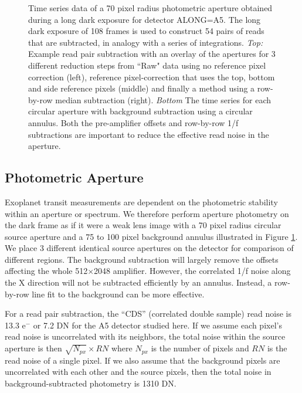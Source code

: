 \documentclass[]{aastex62}
\begin{document}
\begin{figure}[!hbtp]
\caption{Time series data of a 70 pixel radius photometric aperture obtained during a long dark exposure for detector ALONG=A5. The long dark exposure of 108 frames is used to construct 54 pairs of reads that are subtracted, in analogy with a series of integrations.
{\it Top:}  Example read pair subtraction with an overlay of the apertures for 3 different reduction steps from ``Raw" data using no reference pixel correction (left), reference pixel-correction that uses the top, bottom and side reference pixels (middle) and finally a method using a row-by-row median subtraction (right).
{\it Bottom} The time series for each circular aperture with background subtraction using a circular annulus.
Both the pre-amplifier offsets and row-by-row 1/f subtractions are important to reduce the effective read noise in the aperture.
}\label{fig:longDarkPhot}
\end{figure}

\subsection{Photometric Aperture}\label{sec:photApertureDark}

Exoplanet transit measurements are dependent on the photometric stability within an aperture or spectrum.
We therefore perform aperture photometry on the dark frame as if it were a weak lens image with a 70 pixel radius circular source aperture and a 75 to 100 pixel background annulus illustrated in Figure \ref{fig:longDarkPhot}.
We place 3 different identical source apertures on the detector for comparison of different regions.
The background subtraction will largely remove the offsets affecting the whole 512$\times$2048 amplifier.
However, the correlated 1/f noise along the X direction will not be subtracted efficiently by an annulus.
Instead, a row-by-row line fit to the background can be more effective.

For a read pair subtraction, the ``CDS'' (correlated double sample) read noise is 13.3 e$^-$ or 7.2 DN for the A5 detector studied here.
If we assume each pixel's read noise is uncorrelated with its neighbors, the total noise within the source aperture is then $\sqrt{N_{px}} \times RN $ where $N_{px}$ is the number of pixels and $RN$ is the read noise of a single pixel.
If we also assume that the background pixels are uncorrelated with each other and the source pixels, then the total noise in background-subtracted photometry is 1310 DN.
\end{document}
